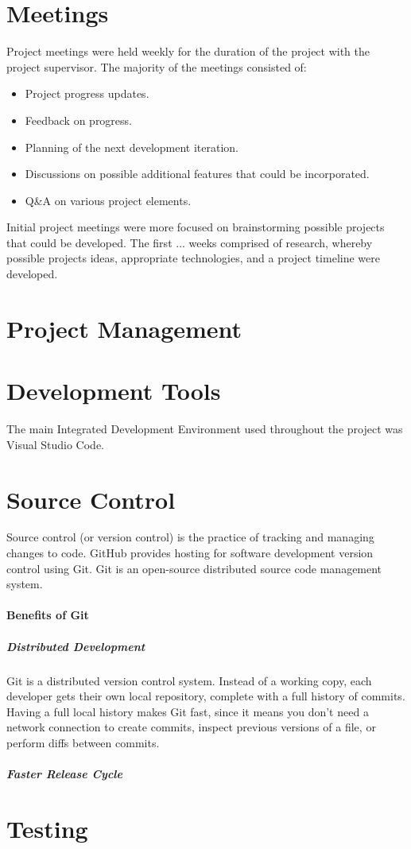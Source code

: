 \section{Meetings}
Project meetings were held weekly for the duration of the project with the project supervisor. The majority of the meetings consisted of:
\begin{itemize}
    \item Project progress updates.
    \item Feedback on progress.
    \item Planning of the next development iteration.
    \item Discussions on possible additional features that could be incorporated.
    \item Q&A on various project elements.
\end{itemize}
\par
\medskip
Initial project meetings were more focused on brainstorming possible projects that could be developed. The first ... weeks comprised of research, whereby possible projects ideas, appropriate technologies, and a project timeline were developed.

\section{Project Management}

\section{Development Tools}
The main Integrated Development Environment used throughout the project was Visual Studio Code.

\section{Source Control}
Source control (or version control) is the practice of tracking and managing changes to code. GitHub provides hosting for software development version control using Git. Git is an open-source distributed source code management system.

\paragraph{Benefits of Git}
\subparagraph{Distributed Development}
Git is a distributed version control system. Instead of a working copy, each developer gets their own local repository, complete with a full history of commits. Having a full local history makes Git fast, since it means you don’t need a network connection to create commits, inspect previous versions of a file, or perform diffs between commits.

\subparagraph{Faster Release Cycle}


\section{Testing}
